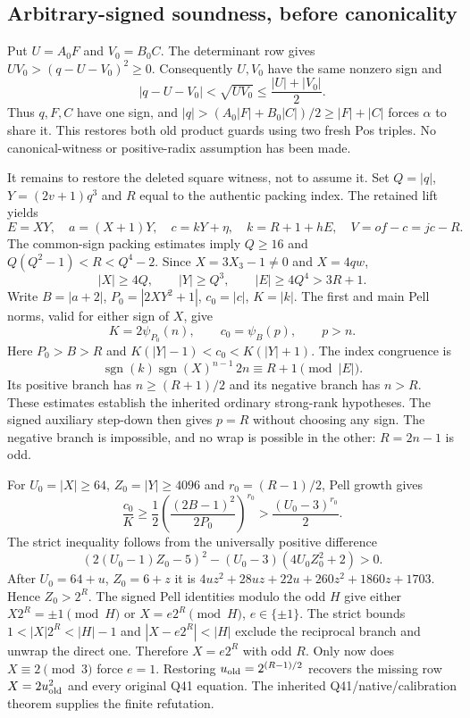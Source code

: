 \subsection{Arbitrary-signed soundness, before canonicality}
Put $U=A_0F$ and $V_0=B_0C$.
The determinant row gives $UV_0>(q-U-V_0)^2\ge0$.
Consequently $U,V_0$ have the same nonzero sign and
\[
 |q-U-V_0|<\sqrt{UV_0}\le\frac{|U|+|V_0|}{2}.
\]
Thus $q,F,C$ have one sign, and
$|q|>(A_0|F|+B_0|C|)/2\ge|F|+|C|$ forces $\alpha$ to share it.
This restores both old product guards using two fresh Pos triples.
No canonical-witness or positive-radix assumption has been made.

It remains to restore the deleted square witness, not to assume it.
Set $Q=|q|$, $Y=(2v+1)q^3$ and $R$ equal to the authentic packing index.
The retained lift yields
\[
 E=XY,\quad a=(X+1)Y,\quad c=kY+\eta,\quad
 k=R+1+hE,\quad V=of-c=jc-R.
\]
The common-sign packing estimates imply
$Q\ge16$ and $Q(Q^2-1)<R<Q^4-2$.
Since $X=3X_3-1\ne0$ and $X=4qw$,
\[
 |X|\ge4Q,\qquad |Y|\ge Q^3,\qquad |E|\ge4Q^4>3R+1.
\]
Write $B=|a+2|$, $P_0=|2XY^2+1|$, $c_0=|c|$, $K=|k|$.
The first and main Pell norms, valid for either sign of $X$, give
\[
 K=2\psi_{P_0}(n),\qquad c_0=\psi_B(p),\qquad p>n.
\]
Here $P_0>B>R$ and $K(|Y|-1)<c_0<K(|Y|+1)$.
The index congruence is
\[
 \operatorname{sgn}(k)\operatorname{sgn}(X)^{n-1}\,2n
 \equiv R+1\pmod {|E|}.
\]
Its positive branch has $n\ge(R+1)/2$ and its negative branch has $n>R$.
These estimates establish the inherited ordinary strong-rank hypotheses.
The signed auxiliary step-down then gives $p=R$ without choosing any sign.
The negative branch is impossible, and no wrap is possible in the other:
$R=2n-1$ is odd.

For $U_0=|X|\ge64$, $Z_0=|Y|\ge4096$ and $r_0=(R-1)/2$,
Pell growth gives
\[
 \frac{c_0}{K}\ge\frac12
 \left(\frac{(2B-1)^2}{2P_0}\right)^{r_0}
 >\frac{(U_0-3)^{r_0}}2.
\]
The strict inequality follows from the universally positive difference
\[
 (2(U_0-1)Z_0-5)^2-(U_0-3)(4U_0Z_0^2+2)>0.
\]
After $U_0=64+u$, $Z_0=6+z$ it is
$4uz^2+28uz+22u+260z^2+1860z+1703$.
Hence $Z_0>2^R$.
The signed Pell identities modulo the odd $H$ give either
$X2^R=\pm1\pmod H$ or $X=e2^R\pmod H$, $e\in\{\pm1\}$.
The strict bounds $1<|X|2^R<|H|-1$ and
$|X-e2^R|<|H|$ exclude the reciprocal branch and unwrap the direct one.
Therefore $X=e2^R$ with odd $R$.
Only now does $X\equiv2\pmod3$ force $e=1$.
Restoring $u_{\rm old}=2^{(R-1)/2}$ recovers the missing row
$X=2u_{\rm old}^2$ and every original Q41 equation.
The inherited Q41/native/calibration theorem supplies the finite refutation.

